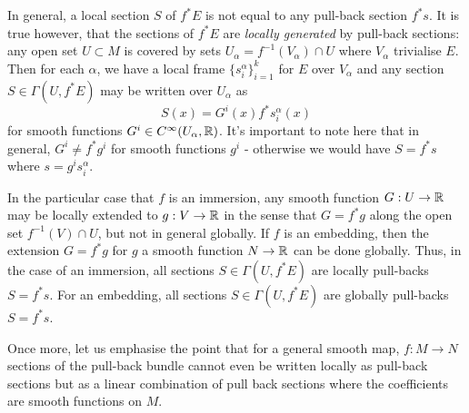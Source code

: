 \documentclass{amsart}
\begin{document}
\begin{rem}
In general, a local section \(S\) of \(f^{\ast} E\) is not equal to any pull-back section \(f^{\ast} s\). It is true however, that the sections of \(f^{\ast} E\) are \emph{locally generated} by pull-back sections: any open set \(U \subset M\) is covered by sets \(U_{\alpha} = f^{-1}(V_{\alpha}) \cap U\) where \(V_{\alpha}\) trivialise \(E\). Then for each \(\alpha\), we have a local frame \(\{s^{\alpha}_i\}_{i=1}^k\) for \(E\) over \(V_{\alpha}\) and any section \(S \in \Gamma(U, f^{\ast} E)\) may be written over \(U_{\alpha}\) as
\[
S(x) = G^i(x) f^{\ast} s^{\alpha}_i(x)
\]
for smooth functions \(G^i \in C^{\infty}(U_{\alpha}, \mathbb{R})\). It's important to note here that in general, \(G^i \ne f^{\ast} g^i\) for smooth functions \(g^i\) - otherwise we would have \(S = f^{\ast} s\) where \(s = g^i s^{\alpha}_i\).

In the particular case that \(f\) is an immersion, any smooth function \(G : U \to \mathbb{R}\) may be locally extended to \(g : V \to \mathbb{R}\) in the sense that \(G = f^{\ast} g\) along the open set \(f^{-1}(V) \cap U\), but not in general globally. If \(f\) is an embedding, then the extension \(G = f^{\ast} g\) for \(g\) a smooth function \(N \to \mathbb{R}\) can be done globally. Thus, in the case of an immersion, all sections \(S \in \Gamma(U, f^{\ast} E)\) are locally pull-backs \(S = f^{\ast} s\). For an embedding, all sections \(S \in \Gamma(U, f^{\ast} E)\) are globally pull-backs \(S = f^{\ast} s\).

Once more, let us emphasise the point that for a general smooth map, \(f: M \to N\) sections of the pull-back bundle cannot even be written locally as pull-back sections but as a linear combination of pull back sections where the coefficients are smooth functions on \(M\).
\end{rem}
\end{document}
